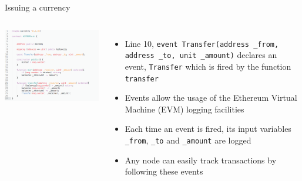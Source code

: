 \documentclass[10pt]{beamer}
\begin{document}
\begin{frame}{Issuing a currency}
	\begin{columns}
	    \includegraphics  [scale=0.3]{Images/contract_new}

	    \begin{itemize}
			\item Line 10, \texttt{event Transfer(address \_from, address \_to, unit  \_amount)} declares an event, \texttt{Transfer} which is fired by the function \texttt{transfer}
			\item Events allow the usage of the Ethereum Virtual Machine (EVM) logging facilities
			\item Each time an event is fired, its input variables \texttt{\_from}, \texttt{\_to} and \texttt{\_amount} are logged
			\item Any node can easily track transactions by following these events
	    \end{itemize}
	\end{columns}
\end{frame}

\end{document}
